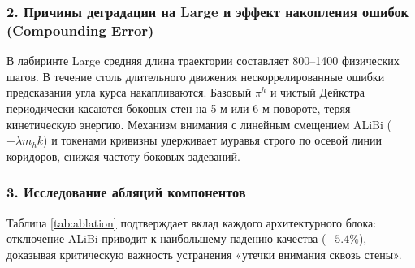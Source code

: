 \subsubsection{2. Причины деградации на Large и эффект накопления ошибок (Compounding Error)}
В лабиринте Large средняя длина траектории составляет 800--1400 физических шагов. В течение столь длительного движения нескоррелированные ошибки предсказания угла курса накапливаются. Базовый $\pi^h$ и чистый Дейкстра периодически касаются боковых стен на 5-м или 6-м повороте, теряя кинетическую энергию. Механизм внимания с линейным смещением ALiBi ($-\lambda m_h k$) и токенами кривизны удерживает муравья строго по осевой линии коридоров, снижая частоту боковых задеваний.

\subsubsection{3. Исследование абляций компонентов}
Таблица \ref{tab:ablation} подтверждает вклад каждого архитектурного блока: отключение ALiBi приводит к наибольшему падению качества ($-5.4\%$), доказывая критическую важность устранения «утечки внимания сквозь стены».

\begin{table}[t]
\centering
\small
\caption{\textbf{Исследование абляций компонентов} \texttt{EnhancedSequencePlanner} (\texttt{antmaze-medium}).}
\label{tab:ablation}
\end{table}

\FloatBarrier
